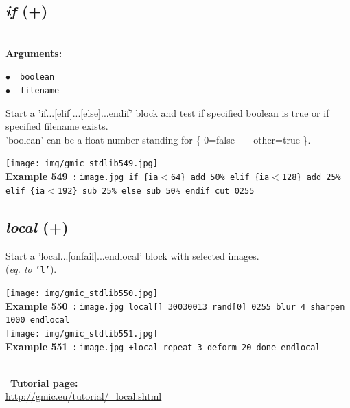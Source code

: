 \documentclass[a4paper,10.5pt,twoside]{book}
\def\comma{\discretionary{,}{}{,}}
\newcommand{\Cb}[1]{\textcolor{cb}{#1}}
\begin{document}
\subsection{\emph{if} (+)}\vspace*{-0.7em}
~\\\textbf{\Cb{Arguments: }}\begin{flushleft}
{\small \Cb{\hspace*{0.5cm}$\bullet$~~\texttt{boolean}}}~~~\\
{\small \Cb{\hspace*{0.5cm}$\bullet$~~\texttt{filename}}}\end{flushleft}
Start a 'if...[elif]...[else]...endif' block and test if specified boolean is true{\comma}
or if specified filename exists.
~\\'boolean' can be a float number standing for \{ 0=false ~$|$~ other=true \}.
\begin{center}\texttt{[image: img/gmic\_stdlib549.jpg]}\\
{\footnotesize \textbf{Example 549~:} \texttt{image.jpg if \{ia$<$64\} add 50\% elif \{ia$<$128\} add 25\% elif \{ia$<$192\} sub 25\% else sub 50\% endif cut 0{\comma}255}}
\end{center}

\subsection{\emph{local} (+)}\vspace*{-0.7em}
Start a 'local...[onfail]...endlocal' block{\comma} with selected images.
~\\(\emph{eq. to} {\small \texttt{'l'}}).
\begin{center}\texttt{[image: img/gmic\_stdlib550.jpg]}\\
{\footnotesize \textbf{Example 550~:} \texttt{image.jpg local[] 300{\comma}300{\comma}1{\comma}3 rand[0] 0{\comma}255 blur 4 sharpen 1000 endlocal}}
\\\texttt{[image: img/gmic\_stdlib551.jpg]}\\
{\footnotesize \textbf{Example 551~:} \texttt{image.jpg +local repeat 3 deform 20 done endlocal}}
\end{center}
~\\
~\textbf{Tutorial page: }\\\url{http://gmic.eu/tutorial/\_local.shtml}
\end{document}
